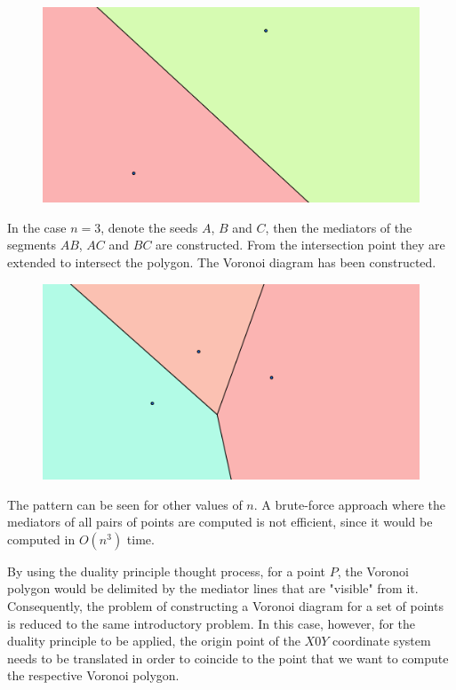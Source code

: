 \documentclass[letterpaper]{article}
\begin{document}
\newpage

\begin{figure} [h!]
\centering
\includegraphics[width=1\textwidth]{pngOfDiagrams/voronoi2d2.png}
\end{figure}

In the case $n = 3$, denote the seeds $A$, $B$ and $C$, then the mediators of the segments $AB$, $AC$ and $BC$ are constructed. From the intersection point they are extended to intersect the polygon. The Voronoi diagram has been constructed.

\begin{figure} [h!]
\centering
\includegraphics[width=1\textwidth]{pngOfDiagrams/voronoi2d3.png}
\end{figure}

The pattern can be seen for other values of $n$. A brute-force approach where the mediators of all pairs of points are computed is not efficient, since it would be computed in $O(n^3)$ time. 

By using the duality principle thought process,  for a point $P$, the Voronoi polygon would be delimited by the mediator lines that are "visible" from it. Consequently, the problem of constructing a Voronoi diagram for a set of points is reduced to the same introductory problem. In this case, however, for the duality principle to be applied, the origin point of the $X0Y$ coordinate system needs to be translated in order to coincide to the point that we want to compute the respective Voronoi polygon. 
\end{document}
